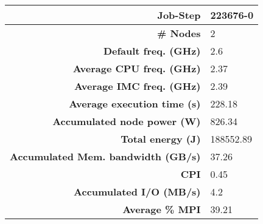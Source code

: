 \begin{tabular}{|r|l|}%
\hline%
\textbf{Job{-}Step}&223676{-}0\\%
\hline%
\textbf{\# Nodes}&2\\%
\hline%
\textbf{Default freq. (GHz)}&2.6\\%
\hline%
\textbf{Average CPU freq. (GHz)}&2.37\\%
\hline%
\textbf{Average IMC freq. (GHz)}&2.39\\%
\hline%
\textbf{Average execution time (s)}&228.18\\%
\hline%
\textbf{Accumulated node power (W)}&826.34\\%
\hline%
\textbf{Total energy (J)}&188552.89\\%
\hline%
\textbf{Accumulated Mem. bandwidth (GB/s)}&37.26\\%
\hline%
\textbf{CPI}&0.45\\%
\hline%
\textbf{Accumulated I/O (MB/s)}&4.2\\%
\hline%
\textbf{Average \% MPI}&39.21\\%
\hline%
\end{tabular}